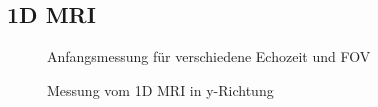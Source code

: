 \subsection{1D MRI}
\begin{figure}[H]
    \centering
    
    \caption{Anfangsmessung für verschiedene Echozeit und FOV}
\end{figure}

\begin{figure}[H]
    \centering
    
    \caption{Messung vom 1D MRI in y-Richtung}
\end{figure} 